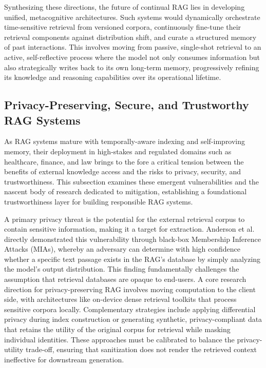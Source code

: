 \documentclass[11pt,a4paper]{article}
\begin{document}
Synthesizing these directions, the future of continual RAG lies in developing unified, metacognitive architectures. Such systems would dynamically orchestrate time-sensitive retrieval from versioned corpora, continuously fine-tune their retrieval components against distribution shift, and curate a structured memory of past interactions. This involves moving from passive, single-shot retrieval to an active, self-reflective process where the model not only consumes information but also strategically writes back to its own long-term memory, progressively refining its knowledge and reasoning capabilities over its operational lifetime.


\subsection{Privacy-Preserving, Secure, and Trustworthy RAG Systems}


As RAG systems mature with temporally-aware indexing and self-improving memory, their deployment in high-stakes and regulated domains such as healthcare, finance, and law brings to the fore a critical tension between the benefits of external knowledge access and the risks to privacy, security, and trustworthiness. This subsection examines these emergent vulnerabilities and the nascent body of research dedicated to mitigation, establishing a foundational trustworthiness layer for building responsible RAG systems.

A primary privacy threat is the potential for the external retrieval corpus to contain sensitive information, making it a target for extraction. Anderson et al. \cite{arxiv:2405.20446v2} directly demonstrated this vulnerability through black-box Membership Inference Attacks (MIAs), whereby an adversary can determine with high confidence whether a specific text passage exists in the RAG's database by simply analyzing the model's output distribution. This finding fundamentally challenges the assumption that retrieval databases are opaque to end-users. A core research direction for privacy-preserving RAG involves moving computation to the client side, with architectures like on-device dense retrieval toolkits that process sensitive corpora locally. Complementary strategies include applying differential privacy during index construction or generating synthetic, privacy-compliant data that retains the utility of the original corpus for retrieval while masking individual identities. These approaches must be calibrated to balance the privacy-utility trade-off, ensuring that sanitization does not render the retrieved context ineffective for downstream generation.
\end{document}
